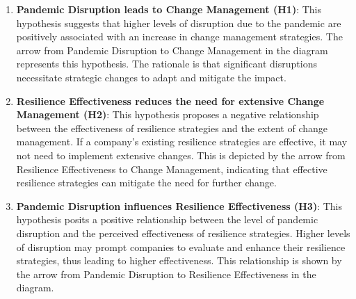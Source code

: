 \begin{enumerate}
    \item \textbf{Pandemic Disruption leads to Change Management (H1)}: This hypothesis suggests that higher levels of disruption due to the pandemic are positively associated with an increase in change management strategies. The arrow from Pandemic Disruption to Change Management in the diagram represents this hypothesis. The rationale is that significant disruptions necessitate strategic changes to adapt and mitigate the impact.

    \item \textbf{Resilience Effectiveness reduces the need for extensive Change Management (H2)}: This hypothesis proposes a negative relationship between the effectiveness of resilience strategies and the extent of change management. If a company’s existing resilience strategies are effective, it may not need to implement extensive changes. This is depicted by the arrow from Resilience Effectiveness to Change Management, indicating that effective resilience strategies can mitigate the need for further change.

    \item \textbf{Pandemic Disruption influences Resilience Effectiveness (H3)}: This hypothesis posits a positive relationship between the level of pandemic disruption and the perceived effectiveness of resilience strategies. Higher levels of disruption may prompt companies to evaluate and enhance their resilience strategies, thus leading to higher effectiveness. This relationship is shown by the arrow from Pandemic Disruption to Resilience Effectiveness in the diagram.

\end{enumerate}

